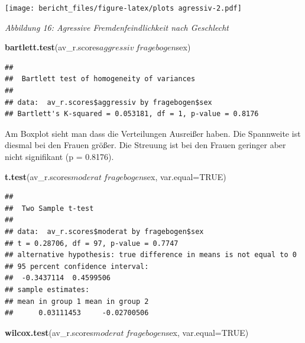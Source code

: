 \documentclass[]{article}
\newenvironment{Shaded}{\begin{snugshade}}{\end{snugshade}}
\newcommand{\KeywordTok}[1]{\textcolor[rgb]{0.13,0.29,0.53}{\textbf{{#1}}}}
\newcommand{\DataTypeTok}[1]{\textcolor[rgb]{0.13,0.29,0.53}{{#1}}}
\newcommand{\StringTok}[1]{\textcolor[rgb]{0.31,0.60,0.02}{{#1}}}
\newcommand{\OtherTok}[1]{\textcolor[rgb]{0.56,0.35,0.01}{{#1}}}
\newcommand{\NormalTok}[1]{{#1}}
\begin{document}
\begin{Shaded}
\end{Shaded}

\texttt{[image: bericht\_files/figure-latex/plots agressiv-2.pdf]}

\begin{center}
\textit{Abbildung 16: Agressive Fremdenfeindlichkeit nach Geschlecht}
\bigskip
\end{center}

\begin{Shaded}
\begin{Highlighting}[]
\KeywordTok{bartlett.test}\NormalTok{(av_r.scores$aggressiv~fragebogen$sex)}
\end{Highlighting}
\end{Shaded}

\begin{verbatim}
## 
##  Bartlett test of homogeneity of variances
## 
## data:  av_r.scores$aggressiv by fragebogen$sex
## Bartlett's K-squared = 0.053181, df = 1, p-value = 0.8176
\end{verbatim}

Am Boxplot sieht man dass die Verteilungen Ausreißer haben. Die
Spannweite ist diesmal bei den Frauen größer. Die Streuung ist bei den
Frauen geringer aber nicht signifikant (p = 0.8176).

\begin{Shaded}
\begin{Highlighting}[]
\KeywordTok{t.test}\NormalTok{(av_r.scores$moderat~fragebogen$sex, }\DataTypeTok{var.equal=}\OtherTok{TRUE}\NormalTok{)}
\end{Highlighting}
\end{Shaded}

\begin{verbatim}
## 
##  Two Sample t-test
## 
## data:  av_r.scores$moderat by fragebogen$sex
## t = 0.28706, df = 97, p-value = 0.7747
## alternative hypothesis: true difference in means is not equal to 0
## 95 percent confidence interval:
##  -0.3437114  0.4599506
## sample estimates:
## mean in group 1 mean in group 2 
##      0.03111453     -0.02700506
\end{verbatim}

\begin{Shaded}
\begin{Highlighting}[]
\KeywordTok{wilcox.test}\NormalTok{(av_r.scores$moderat~fragebogen$sex, }\DataTypeTok{var.equal=}\OtherTok{TRUE}\NormalTok{)}
\end{Highlighting}
\end{Shaded}
\end{document}
